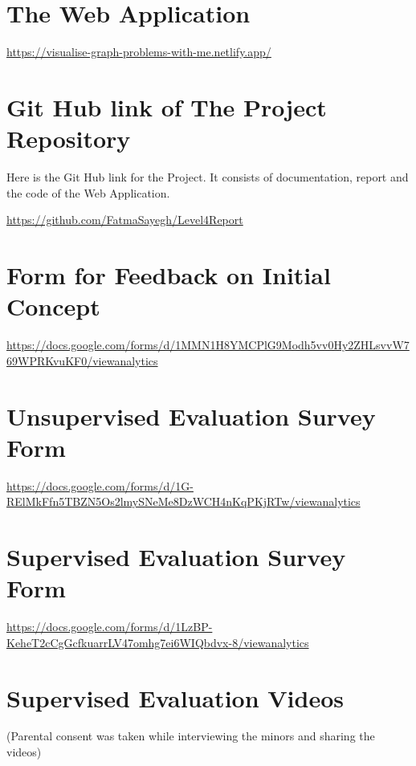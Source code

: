
\section{The Web Application}
\href{https://visualise-graph-problems-with-me.netlify.app/} 
{https://visualise-graph-problems-with-me.netlify.app/}

\section{Git Hub link of The Project Repository}
\label{links: repository}
Here is the Git Hub link for the Project. It consists of documentation, report and the
code of the Web Application.

\href{https://github.com/FatmaSayegh/Level4Report} {https://github.com/FatmaSayegh/Level4Report}

\section{Form for Feedback on Initial Concept}
\href{https://docs.google.com/forms/d/1MMN1H8YMCPlG9Modh5vv0Hy2ZHLsvvW769WPRKvuKF0/viewanalytics} {https://docs.google.com/forms/d/1MMN1H8YMCPlG9Modh5vv0Hy2ZHLsvvW769WPRKvuKF0/viewanalytics}

\section{Unsupervised Evaluation Survey Form}
\label{links: unsupervised}
\href{https://docs.google.com/forms/d/1G-RElMkFfn5TBZN5Os2lmySNeMe8DzWCH4nKqPKjRTw/viewanalytics} {https://docs.google.com/forms/d/1G-RElMkFfn5TBZN5Os2lmySNeMe8DzWCH4nKqPKjRTw/viewanalytics}

\section{Supervised Evaluation Survey Form}
\label{links: supervised}
\href{https://docs.google.com/forms/d/1LzBP-KeheT2cCgGcfkuarrLV47omhg7ei6WIQbdvx-8/viewanalytics} {https://docs.google.com/forms/d/1LzBP-KeheT2cCgGcfkuarrLV47omhg7ei6WIQbdvx-8/viewanalytics}

\section{Supervised Evaluation Videos}
\label{links: supervisedvids}
(Parental consent was taken while interviewing the minors and sharing the videos)
